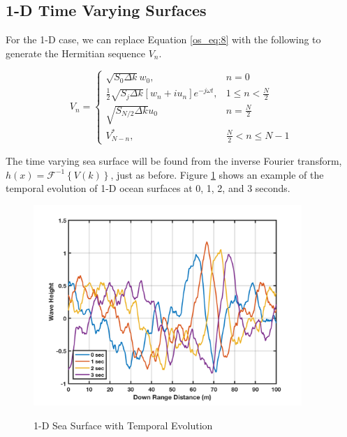 \subsection {1-D Time Varying Surfaces}
For the 1-D case, we can replace Equation \ref{os_eq:8} with the following to generate the Hermitian sequence $V_n$.

\begin{equation}
  \label{os_eq:888}   
  V_n = \begin{cases}
    \sqrt{S_0\Delta k}w_0, & n = 0 \\
    \frac{1}{2}\sqrt{S_j\Delta k}\left[w_n + iu_n \right]e^{-j\omega t}, & 1 \leq n < \frac{N}{2} \\
   \sqrt{S_{N/2}\Delta k}u_0 & n = \frac{N}{2} \\
    V_{N-n}^*, &  \frac{N}{2} < n \leq N-1 
  \end{cases} 
\end{equation}
\renewcommand{\baselinestretch}{2} \small\normalsize

The time varying sea surface will be found from the inverse Fourier transform, $h(x) = \mathcal{F}^{-1}\left\{V(k) \right\}$, just as before. Figure \ref{os_fig:15} shows an example of the temporal evolution of 1-D ocean surfaces at 0, 1, 2, and 3 seconds.

\begin{figure}[H]
  \begin{center}
\includegraphics[width=4in]{../media/Ocean_Surface/temporal_sea_surfaces.png}
  \end{center}
  \renewcommand{\baselinestretch}{1} \small\normalsize
  \begin{quote}
    \caption[1-D Sea Surface with Temporal Evolution]{1-D Sea Surface with Temporal Evolution\label{os_fig:15}}
  \end{quote}
\end{figure}
\renewcommand{\baselinestretch}{2} \small\normalsize

